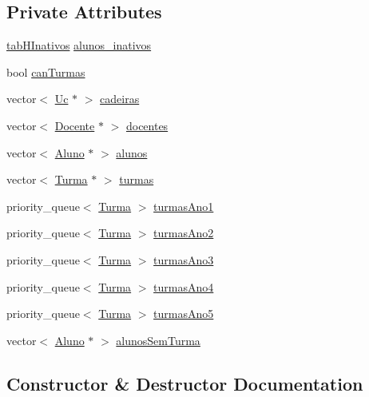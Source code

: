 \subsection*{Private Attributes}
\begin{DoxyCompactItemize}
\item 
\hyperlink{mieic_8h_a48894bb701fe596264988f4453ff8f3f}{tab\+H\+Inativos} \hyperlink{class_mieic_adffe68e30feb27ccb73a39cfee4fbb78}{alunos\+\_\+inativos}
\item 
bool \hyperlink{class_mieic_a5083c06ef88abf95375f127dbc0829dc}{can\+Turmas}
\item 
vector$<$ \hyperlink{class_uc}{Uc} $\ast$ $>$ \hyperlink{class_mieic_afc2464f50b64724c74c369a252d10a0f}{cadeiras}
\item 
vector$<$ \hyperlink{class_docente}{Docente} $\ast$ $>$ \hyperlink{class_mieic_a7adb63b4146994f9a4a83eab412d2cae}{docentes}
\item 
vector$<$ \hyperlink{class_aluno}{Aluno} $\ast$ $>$ \hyperlink{class_mieic_a3840d1d5343ac6ac8b42e698e6cfde3e}{alunos}
\item 
vector$<$ \hyperlink{class_turma}{Turma} $\ast$ $>$ \hyperlink{class_mieic_a1066a7642990c43e6409a5bd0e93ebc6}{turmas}
\item 
priority\+\_\+queue$<$ \hyperlink{class_turma}{Turma} $>$ \hyperlink{class_mieic_afcc92dc760be8d7dcaa8ff9241351917}{turmas\+Ano1}
\item 
priority\+\_\+queue$<$ \hyperlink{class_turma}{Turma} $>$ \hyperlink{class_mieic_adf5ce928562665eb89260ba4a6093c62}{turmas\+Ano2}
\item 
priority\+\_\+queue$<$ \hyperlink{class_turma}{Turma} $>$ \hyperlink{class_mieic_a8e4588349a5992556fec1d1d51772675}{turmas\+Ano3}
\item 
priority\+\_\+queue$<$ \hyperlink{class_turma}{Turma} $>$ \hyperlink{class_mieic_a9de15327b80934561f2bf18538d0da99}{turmas\+Ano4}
\item 
priority\+\_\+queue$<$ \hyperlink{class_turma}{Turma} $>$ \hyperlink{class_mieic_afb0cd6587411458b5e281b1862c86b69}{turmas\+Ano5}
\item 
vector$<$ \hyperlink{class_aluno}{Aluno} $\ast$ $>$ \hyperlink{class_mieic_a807d4f744ae0543caeec3f9c04e714f7}{alunos\+Sem\+Turma}
\end{DoxyCompactItemize}


\subsection{Constructor \& Destructor Documentation}
\hypertarget{class_mieic_ad42e035c1e9be5fd8d526761c7bb8418}{}\label{class_mieic_ad42e035c1e9be5fd8d526761c7bb8418} 
